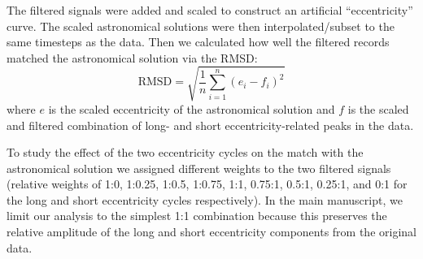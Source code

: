 \documentclass[draft]{agujournal2019}
\begin{document}
The filtered signals were added and scaled to construct an artificial ``eccentricity'' curve.
The scaled astronomical solutions were then interpolated/subset to the same timesteps as the data.
Then we calculated how well the filtered records matched the astronomical solution via the \gls{RMSD}:
\begin{equation}\label{eqn:rmsd}
    \text{RMSD} = \sqrt{\frac{1}{n}\sum_{i=1}^{n}(e_{i} - f_{i})^{2}}
\end{equation}
where \(e\) is the scaled eccentricity of the astronomical solution and \(f\) is the scaled and filtered combination of long- and short eccentricity-related peaks in the data.

To study the effect of the two eccentricity cycles on the match with the astronomical solution
we assigned different weights to the two filtered signals
(relative weights of 1:0, 1:0.25, 1:0.5, 1:0.75, 1:1, 0.75:1, 0.5:1, 0.25:1, and 0:1 for the long and short eccentricity cycles respectively).
In the main manuscript, we limit our analysis to the simplest 1:1 combination because this preserves the relative amplitude of the long and short eccentricity components from the original data.
\end{document}
